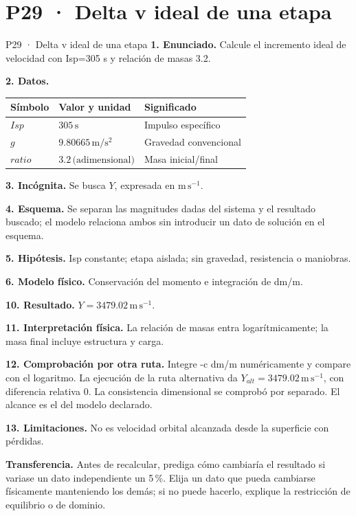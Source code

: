 \chapter*{P29 · Delta v ideal de una etapa}
\begin{studiumworked}{P29 · Delta v ideal de una etapa}
\textbf{1. Enunciado.} Calcule el incremento ideal de velocidad con Isp=305 s y relación de masas 3.2.

\textbf{2. Datos.}
\begin{longtable}{p{.16\linewidth}p{.35\linewidth}p{.38\linewidth}}\toprule Símbolo & Valor y unidad & Significado\\\midrule\endhead
$Isp$ & $305\,\mathrm s$ & Impulso específico\\
$g$ & $9.80665\,\mathrm{m/s^2}$ & Gravedad convencional\\
$ratio$ & $3.2\,\text{(adimensional)}$ & Masa inicial/final\\
\bottomrule\end{longtable}
\textbf{3. Incógnita.} Se busca $Y$, expresada en $\mathrm{m\,s^{-1}}$.

\textbf{4. Esquema.} Se separan las magnitudes dadas del sistema y el resultado buscado; el modelo relaciona ambos sin introducir un dato de solución en el esquema.

\textbf{5. Hipótesis.} Isp constante; etapa aislada; sin gravedad, resistencia o maniobras.

\textbf{6. Modelo físico.} Conservación del momento e integración de dm/m.


\textbf{10. Resultado.} $Y=3479.02\,\mathrm{m\,s^{-1}}$.

\textbf{11. Interpretación física.} La relación de masas entra logarítmicamente; la masa final incluye estructura y carga.

\textbf{12. Comprobación por otra ruta.} Integre -c dm/m numéricamente y compare con el logaritmo. La ejecución de la ruta alternativa da $Y_{alt}=3479.02\,\mathrm{m\,s^{-1}}$, con diferencia relativa $0$. La consistencia dimensional se comprobó por separado. El alcance es el del modelo declarado.

\textbf{13. Limitaciones.} No es velocidad orbital alcanzada desde la superficie con pérdidas.

\textbf{Transferencia.} Antes de recalcular, prediga cómo cambiaría el resultado si variase un dato independiente un 5\,\%. Elija un dato que pueda cambiarse físicamente manteniendo los demás; si no puede hacerlo, explique la restricción de equilibrio o de dominio.\par
\end{studiumworked}
